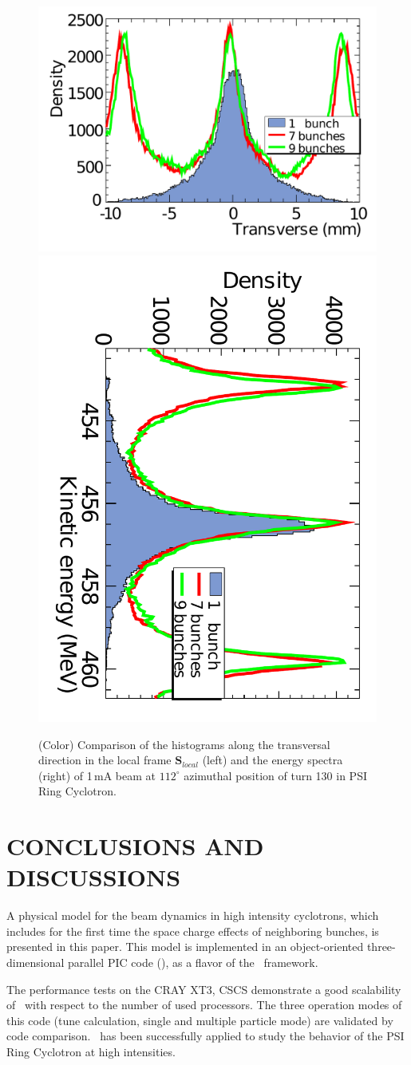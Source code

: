 \documentclass[aps,prstab,onecolumn,superscriptaddress,showpacs]{revtex4}
\newcommand{\bs}[1]{\mathbf #1}
\begin{document}
\begin{figure}
  \includegraphics[width=0.45\linewidth]{figures/C9B7BSB-R-1mA-130.pdf}
  \includegraphics[angle=90,width=0.45\linewidth]{figures/C9B7BSB-Energy-1mA-130.pdf}
  \caption{(Color) Comparison of the histograms along the transversal direction in the local frame ${\bs{S}_{local}}$ (left) and the energy spectra (right) of 1\,mA beam
    at $112^\circ$ azimuthal position of turn 130 in PSI Ring Cyclotron.}
  \label{fig:NBcompare}
\end{figure}

\section{CONCLUSIONS AND DISCUSSIONS}
A physical model for the beam dynamics in high intensity cyclotrons, which includes for the first time the space charge effects
of neighboring bunches, is presented in this paper. 
This model is implemented in an object-oriented three-dimensional parallel PIC code (\opalcycl), 
as a flavor of the \opal\, framework. 

The performance tests on the CRAY XT3, CSCS demonstrate a good scalability of \opalcycl \ with respect to the number of used processors. 
The three operation modes of this code (tune calculation, single and multiple particle mode) are validated by code comparison. 
\opalcycl \ has been successfully applied to study the behavior of the PSI Ring Cyclotron at high intensities.
\end{document}
